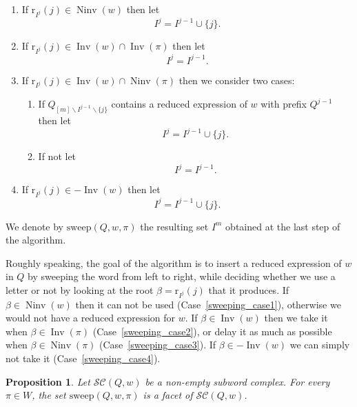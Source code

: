 \documentclass{amsart}
\newtheorem{proposition}[theorem]{Proposition}
\theoremstyle{definition}
\DeclareMathOperator{\Inv}{Inv} %
\DeclareMathOperator{\Ninv}{Ninv} %
\newcommand{\defn}[1]{\textbf{\textsf{\color{PineGreen} #1}}} %
\newcommand{\subwordComplex}{\mathcal{SC}} %
\newcommand{\rootFunction}[2]{\mathrm{r}_{#1}(#2)} %
\newcommand{\sweepingAlgorithm}{\mathrm{sweep}} %
\begin{document}
\begin{enumerate}
    \item If $\rootFunction{I^j}{j}\in \Ninv(w)$ then let 
    \[
    I^j=I^{j-1}\cup\{j\}.
    \] 
    \label{sweeping_case1}
    \item If $\rootFunction{I^j}{j}\in \Inv(w) \cap \Inv (\pi)$ then let 
    \[
    I^j=I^{j-1}. 
    \]
    \label{sweeping_case2}
    \item If $\rootFunction{I^j}{j}\in \Inv(w) \cap \Ninv (\pi)$ then we consider two cases: 
    \label{sweeping_case3} 
    \begin{enumerate}
        \item If $Q_{[m]\smallsetminus I^{j-1}\smallsetminus \{j\}}$ contains a reduced expression of $w$ with prefix $Q^{j-1}$ then let 
        \[
        I^j=I^{j-1}\cup \{j\}. 
        \]        
        \label{sweeping_case3a}
        \item If not let 
        \[
        I^j=I^{j-1}.
        \]
        \label{sweeping_case3b}
    \end{enumerate}
    \item If $\rootFunction{I^j}{j}\in -\Inv(w)$ then let
    \[
    I^j=I^{j-1}\cup \{j\}.
    \]
    \label{sweeping_case4}
\end{enumerate}

We denote by \defn{$\sweepingAlgorithm(Q,w,\pi)$} the resulting set $I^m$ obtained at the last step of the algorithm.

Roughly speaking, the goal of the algorithm is to insert a reduced expression of $w$ in $Q$ by sweeping the word from left to right, while deciding whether we use a letter or not by looking at the root $\beta=\rootFunction{I^j}{j}$ that it produces. 
If $\beta \in \Ninv(w)$ then it can not be used (Case~\eqref{sweeping_case1}), otherwise we would not have a reduced expression for $w$. 
If $\beta \in \Inv(w)$ then we take it when $\beta \in \Inv(\pi)$ (Case~\eqref{sweeping_case2}), or delay it as much as possible when $\beta \in \Ninv(\pi)$ (Case~\eqref{sweeping_case3}). 
If $\beta \in -\Inv(w)$ we can simply not take it (Case~\eqref{sweeping_case4}).

\begin{proposition}
\label{prop_sweeping1}
    Let $\subwordComplex(Q,w)$ be a non-empty subword complex.
    For every $\pi \in W$, the set $\sweepingAlgorithm(Q,w,\pi)$ is a facet of $\subwordComplex(Q,w)$.
\end{proposition}
\end{document}
